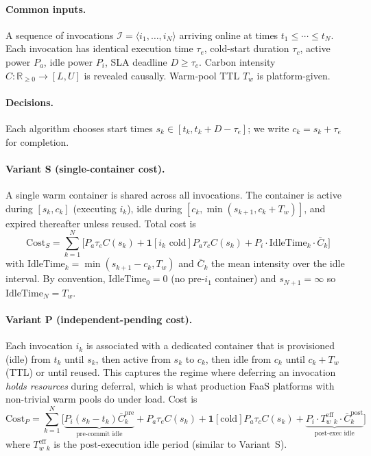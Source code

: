 \paragraph{Common inputs.} A sequence of invocations
$\mathcal{I} = \langle i_1, \ldots, i_N \rangle$ arriving online
at times $t_1 \le \cdots \le t_N$. Each invocation has identical
execution time $\tau_e$, cold-start duration $\tau_c$, active power
$P_a$, idle power $P_i$, SLA deadline $D \ge \tau_e$. Carbon intensity
$C: \mathbb{R}_{\ge 0} \to [L, U]$ is revealed causally. Warm-pool
TTL $T_w$ is platform-given.

\paragraph{Decisions.} Each algorithm chooses start times
$s_k \in [t_k, t_k + D - \tau_e]$; we write $c_k = s_k + \tau_e$ for
completion.

\paragraph{Variant S (single-container cost).}
A single warm container is shared across all invocations. The
container is active during $[s_k, c_k]$ (executing $i_k$), idle
during $[c_k, \min(s_{k+1}, c_k + T_w)]$, and expired thereafter
unless reused. Total cost is
\[
\mathrm{Cost}_S = \sum_{k=1}^{N}\!\Big[P_a \tau_e C(s_k)
 + \mathbf{1}[i_k\text{ cold}] P_a \tau_c C(s_k)
 + P_i \cdot \mathrm{IdleTime}_k \cdot \bar{C}_k\Big]
\]
with $\mathrm{IdleTime}_k = \min(s_{k+1} - c_k, T_w)$ and
$\bar{C}_k$ the mean intensity over the idle interval.
By convention, $\mathrm{IdleTime}_0 = 0$ (no pre-$i_1$ container) and
$s_{N+1} = \infty$ so $\mathrm{IdleTime}_N = T_w$.

\paragraph{Variant P (independent-pending cost).}
Each invocation $i_k$ is associated with a dedicated container
that is provisioned (idle) from $t_k$ until $s_k$, then active from
$s_k$ to $c_k$, then idle from $c_k$ until $c_k + T_w$ (TTL) or until
reused. This captures the regime where deferring an invocation
\emph{holds resources} during deferral, which is what production
FaaS platforms with non-trivial warm pools do under load. Cost is
\[
\mathrm{Cost}_P = \sum_{k=1}^{N}\!\Big[
  \underbrace{P_i (s_k - t_k) \bar{C}_k^{\mathrm{pre}}}_{\text{pre-commit idle}}
+ P_a \tau_e C(s_k) + \mathbf{1}[\text{cold}] P_a \tau_c C(s_k)
+ \underbrace{P_i \cdot T_w^{\mathrm{eff}}_k \cdot \bar{C}_k^{\mathrm{post}}}_{\text{post-exec idle}}\Big]
\]
where $T_w^{\mathrm{eff}}_k$ is the post-execution idle period (similar
to Variant~S).

